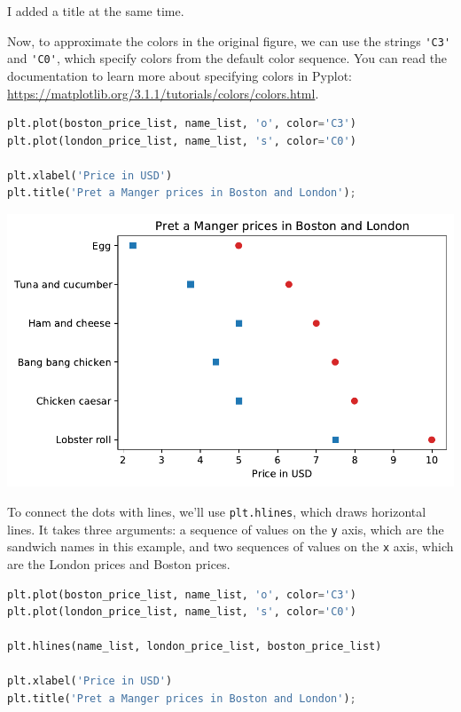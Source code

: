 I added a title at the same time.

Now, to approximate the colors in the original figure, we can use the
strings \passthrough{\lstinline!'C3'!} and
\passthrough{\lstinline!'C0'!}, which specify colors from the default
color sequence. You can read the documentation to learn more about
specifying colors in Pyplot:
\url{https://matplotlib.org/3.1.1/tutorials/colors/colors.html}.

\begin{lstlisting}[language=Python]
plt.plot(boston_price_list, name_list, 'o', color='C3')
plt.plot(london_price_list, name_list, 's', color='C0')

plt.xlabel('Price in USD')
plt.title('Pret a Manger prices in Boston and London');
\end{lstlisting}

\begin{center}
\includegraphics[scale=0.75]{chapters/06_plotting_files/06_plotting_46_0.pdf}
\end{center}

To connect the dots with lines, we'll use
\passthrough{\lstinline!plt.hlines!}, which draws horizontal lines. It
takes three arguments: a sequence of values on the
\passthrough{\lstinline!y!} axis, which are the sandwich names in this
example, and two sequences of values on the \passthrough{\lstinline!x!}
axis, which are the London prices and Boston prices.

\begin{lstlisting}[language=Python]
plt.plot(boston_price_list, name_list, 'o', color='C3')
plt.plot(london_price_list, name_list, 's', color='C0')

plt.hlines(name_list, london_price_list, boston_price_list)

plt.xlabel('Price in USD')
plt.title('Pret a Manger prices in Boston and London');
\end{lstlisting}

